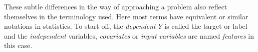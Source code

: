 
These subtle differences in the way of approaching a problem also reflect themselves in the terminology used. Here most terms have equivalent or similar notations in statistics. To start off, the \textit{dependent} $Y$ is called the target or label and the \textit{independent} variables, \textit{covariates} or \textit{input variables} are named \textit{features} in this case. 

